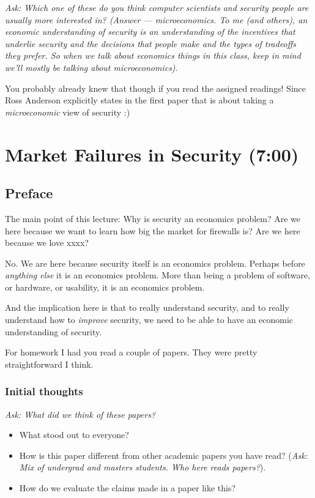 \documentclass[11pt]{article}
\begin{document}
{\it Ask: Which one of these do you think computer scientists and security people are usually more interested in? (Answer --- microeconomics. To me (and others), an economic understanding of security is an understanding of the incentives that underlie security and the decisions that people make and the types of tradeoffs they prefer. So when we talk about economics things in this class, keep in mind we'll mostly be talking about microeconomics).}

You probably already knew that though if you read the assigned readings! Since Ross Anderson explicitly states in the first paper that is about taking a {\it microeconomic} view of security :) 




\section{Market Failures in Security (7:00)}


\subsection{Preface}

The main point of this lecture: Why is security an economics problem? Are we here because we want to learn how big the market for firewalls is? Are we here because we love xxxx?

No. We are here because security itself is an economics problem. Perhaps before \textit{anything else} it is an economics problem. More than being a problem of software, or hardware, or usability, it is an economics problem.

And the implication here is that to really understand security, and to really understand how to \textit{improve} security, we need to be able to have an economic understanding of security. 

For homework I had you read a couple of papers. They were pretty straightforward I think.

\subsubsection{Initial thoughts}

{\it Ask: What did we think of these papers?}

\begin{itemize}
    \item What stood out to everyone?
    \item How is this paper different from other academic papers you have read? ({\it Ask: Mix of undergrad and masters students. Who here reads papers?}). 
    \item How do we evaluate the claims made in a paper like this?
\end{itemize}
\end{document}

